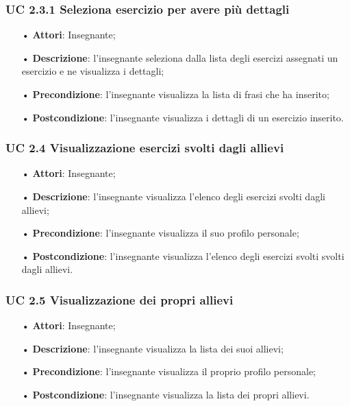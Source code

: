\subsubsection{UC 2.3.1 Seleziona esercizio per avere più dettagli}
\begin{itemize}
	\item[•] \textbf{Attori}: Insegnante;
	\item[•] \textbf{Descrizione}: l'insegnante seleziona dalla lista degli esercizi assegnati un esercizio e ne visualizza i dettagli;
	\item[•] \textbf{Precondizione}: l'insegnante visualizza la lista di frasi che ha inserito;
	\item[•] \textbf{Postcondizione}: l'insegnante visualizza i dettagli di un esercizio inserito.
\end{itemize}




\subsubsection{UC 2.4 Visualizzazione esercizi svolti dagli allievi}

\begin{itemize}
	\item[•] \textbf{Attori}: Insegnante;
	\item[•] \textbf{Descrizione}:  l'insegnante visualizza l'elenco degli esercizi svolti dagli allievi;
	\item[•] \textbf{Precondizione}: l'insegnante visualizza il suo profilo personale;
	\item[•] \textbf{Postcondizione}: l'insegnante visualizza l'elenco degli esercizi svolti svolti dagli allievi.
\end{itemize}

\subsubsection{UC 2.5 Visualizzazione dei propri allievi}



\begin{itemize}
	\item[•] \textbf{Attori}: Insegnante;
	\item[•] \textbf{Descrizione}: l'insegnante visualizza la lista dei suoi allievi;
	\item[•] \textbf{Precondizione}: l'insegnante visualizza il proprio profilo personale;
	\item[•] \textbf{Postcondizione}: l'insegnante visualizza la lista dei propri allievi.
\end{itemize}




